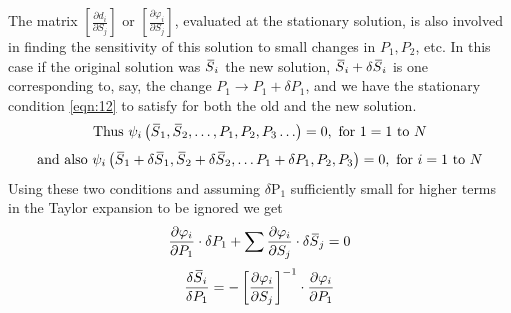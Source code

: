 The matrix $\left[\frac{\partial d_{i}}{\partial S_{j}}\right]$ or $\left[\frac{\partial \varphi_{i}}{\partial S_{j}}\right]$, evaluated at the stationary solution, is also involved in finding the sensitivity of this solution to small changes in $P_{1}, P_{2}$, etc. In this case if the original solution was $\,\overline{\!{S}}_{i}$ the new solution, $\,\overline{\!{S}}_{i} + \delta \,\overline{\!{S}}_{i}$ is one corresponding to, say, the change $P_{1} \rightarrow P_{1} + \delta P_{1}$, and we have the stationary condition \eqref{eqn:12} to satisfy for both the old and the new solution.
%
$$ \mbox{Thus } \psi_{i}\left(\,\overline{\!{S}}_{1}, \,\overline{\!{S}}_{2}, \ldots, P_{1}, P_{2}, P_{3} \ldots\right)=0, \text { for } 1=1 \text { to } N $$
\vspace{-6pt}
$$ \mbox{and also } \psi_{i}\left(\,\overline{\!{S}}_{1}+\delta \,\overline{\!{S}}_{1}, \,\overline{\!{S}}_{2}+\delta \,\overline{\!{S}}_{2}, \ldots P_{1}+\delta P_{1}, P_{2}, P_{3}\right)=0, \text { for } i=1 \text{ to } N $$
%
\vspace{14pt}
Using these two conditions and assuming $\delta \mathrm{P}_{1}$ sufficiently small for higher terms in the Taylor expansion to be ignored we get
%
$$ \frac{\partial \varphi_{i}}{\partial P_{1}} \cdot \delta P_{1} + \sum \frac{\partial \varphi_{i}}{\partial S_{j}} \cdot \delta \olsi{S}_{j}=0 $$
%
\begin{equation}
\frac{\delta \olsi{S}_{i}}{\delta P_{1}} = -\left[\frac{\partial \varphi_{i}}{\partial S_{j}}\right]^{-1} \cdot \frac{\partial \varphi_{i}}{\partial P_{1}}
\label{eqn:16}
\end{equation}

